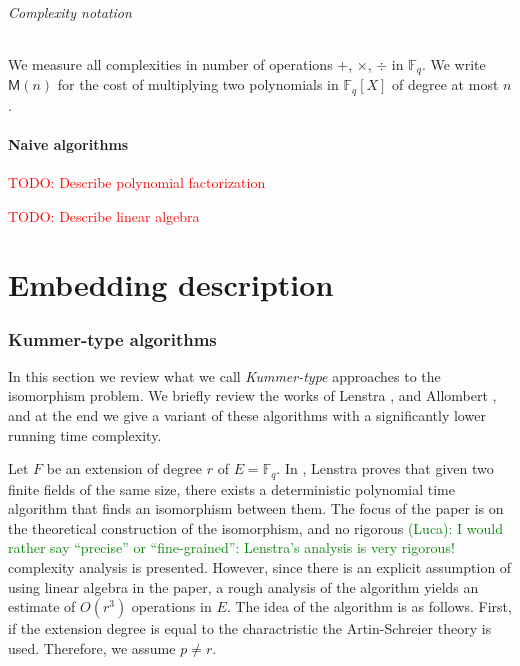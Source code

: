 \documentclass[12pt]{article}
\theoremstyle{plain}
\theoremstyle{definition}
\newcommand{\todo}[1]{\textcolor{red}{TODO: #1}}
\newcommand{\comment}[2][Note]{\textcolor{green}{(#1): #2}}
\def\F{\ensuremath{\mathbb{F}}}
\def\MM{\ensuremath{\mathsf{M}}}
\newcounter{algorithm}
\begin{document}
\paragraph{Complexity notation} We measure all complexities in number
of operations $+$, $\times$, $\div$ in $\F_q$. We write $\MM(n)$ for
the cost of multiplying two polynomials in $\F_q[X]$ of degree at most
$n$.


\subsection{Naive algorithms}

\todo{Describe polynomial factorization}

\todo{Describe linear algebra}



\part{Embedding description}


\section{Kummer-type algorithms}

In this section we review what we call \textit{Kummer-type} approaches to the isomorphism problem. 
We briefly review the works of Lenstra \cite{LenstraJr91}, and Allombert \cite{Allombert02}, and at 
the end we give a variant of these algorithms with a significantly lower running time complexity.

Let $F$ be an extension of degree $r$ of $E = \F_q$. In \cite{LenstraJr91}, Lenstra proves that 
given two finite fields of the same size, there exists a deterministic polynomial time algorithm 
that finds an isomorphism between them. The focus of the paper is on the theoretical construction 
of the isomorphism, and no rigorous \comment[Luca]{I would rather say ``precise'' or ``fine-grained'': Lenstra's analysis is very rigorous!} complexity analysis is presented. However, since there is an 
explicit assumption of using linear algebra in the paper, a rough analysis of the algorithm yields 
an estimate of $O(r^3)$ operations in $E$. The idea of the algorithm is as follows. First, if 
the extension degree is equal to the charactristic the Artin-Schreier theory is used. Therefore, we 
assume $p \ne r$.
\end{document}

